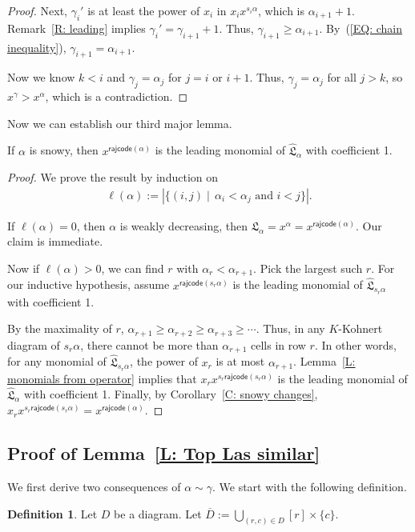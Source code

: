 \documentclass[10pt]{amsart}
\theoremstyle{plain}
\theoremstyle{plain}
\theoremstyle{definition}
\theoremstyle{definition}
\newtheorem{defn}[defn]{Definition}
\theoremstyle{definition}
\theoremstyle{plain}
\theoremstyle{plain}
\theoremstyle{plain}
\theoremstyle{plain}
\theoremstyle{plain}
\theoremstyle{remark}
\theoremstyle{remark}
\theoremstyle{plain}
\theoremstyle{plain}
\newenvironment{manuallemma}[1]{
  \renewcommand\themanuallemmainner{#1}
  \manuallemmainner
}{\endmanuallemmainner}
\newcommand{\fL}{\mathfrak{L}}
\newcommand{\fLb}{\fL}
\newcommand{\topLas}{\widehat{\fL}}
\newcommand{\rajcode}{\mathsf{rajcode}}
\begin{document}
\begin{proof}
Next, 
$\gamma_{i}'$ is at least
the power of $x_{i}$ in $x_ix^{s_i \alpha}$,
which is $\alpha_{i+1} + 1$.
Remark~\ref{R: leading} implies $\gamma_i' = \gamma_{i+1} + 1$.
Thus, $\gamma_{i+1} \geqslant \alpha_{i+1}$.
By~(\ref{EQ: chain inequality}), $\gamma_{i+1} = \alpha_{i+1}$.

Now we know $k < i$
and $\gamma_j = \alpha_j$ for $j = i$ or $i+1$.
Thus, $\gamma_j = \alpha_j$ for all $j > k$,
so~$x^\gamma > x^\alpha$, which is a contradiction. 
\end{proof}

Now we can establish our third major lemma. 
\begin{manuallemma}{\ref{L: snowy leading}}
If $\alpha$ is snowy, 
then $x^{\rajcode(\alpha)}$ is the leading monomial of 
$\topLas_\alpha$ with coefficient 1.
\end{manuallemma}
\begin{proof}
We prove the result by induction on 
\begin{align*}
\ell(\alpha) := |\{(i,j) \mid\, \alpha_i < \alpha_j \text{ and } i < j\}|.
\end{align*}

If $\ell(\alpha)=0$, then $\alpha$ is weakly decreasing, 
then $\fLb_\alpha = 
x^\alpha = x^{\rajcode(\alpha)}$.
Our claim is immediate. 

Now if $\ell(\alpha) > 0$,
we can find $r$ with $\alpha_r < \alpha_{r+1}$.
Pick the largest such $r$.
For our inductive hypothesis,
assume $x^{\rajcode(s_r \alpha)}$ is the leading monomial 
of $\topLas_{s_r \alpha}$ with coefficient 1.

By the maximality of $r$, 
$\alpha_{r+1} \geqslant \alpha_{r+2} 
\geqslant \alpha_{r+3} \geqslant \cdots$.
Thus, in any $K$-Kohnert diagram of $s_r \alpha$,
there cannot be more than $\alpha_{r+1}$ cells
in row $r$.
In other words, 
for any monomial of $\topLas_{s_r \alpha}$,
the power of $x_r$ is at most $\alpha_{r+1}$.
Lemma~\ref{L: monomials from operator} implies that $x_r x^{s_r \rajcode(s_r \alpha)}$
is the leading monomial of $\topLas_{\alpha}$ with coefficient 1. 
Finally, by Corollary~\ref{C: snowy changes},
$x_r x^{s_r \rajcode(s_r \alpha)} = x^{\rajcode(\alpha)}$.
\end{proof}


\subsection{Proof of Lemma~\ref{L: Top Las similar}}
\label{SS: last major lemma}
We first derive two consequences 
of $\alpha \sim \gamma$.
We start with the following definition.
\begin{defn}
Let $D$ be a diagram.
Let $\overline{D} := \bigcup_{(r,c) \in D} [r] \times \{c\}$.
\end{defn}
\end{document}
